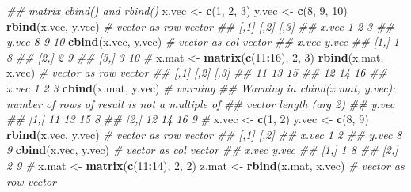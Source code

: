 \documentclass[
]{book}
\newenvironment{Shaded}{\begin{snugshade}}{\end{snugshade}}
\newcommand{\CommentTok}[1]{\textcolor[rgb]{0.56,0.35,0.01}{\textit{#1}}}
\newcommand{\DecValTok}[1]{\textcolor[rgb]{0.00,0.00,0.81}{#1}}
\newcommand{\KeywordTok}[1]{\textcolor[rgb]{0.13,0.29,0.53}{\textbf{#1}}}
\newcommand{\NormalTok}[1]{#1}
\newcommand{\OperatorTok}[1]{\textcolor[rgb]{0.81,0.36,0.00}{\textbf{#1}}}
\newcommand{\StringTok}[1]{\textcolor[rgb]{0.31,0.60,0.02}{#1}}
\begin{document}
\begin{Shaded}
\begin{Highlighting}[]
\CommentTok{\#\# matrix cbind() and rbind()}
\NormalTok{x.vec \textless{}{-}}\StringTok{ }\KeywordTok{c}\NormalTok{(}\DecValTok{1}\NormalTok{, }\DecValTok{2}\NormalTok{, }\DecValTok{3}\NormalTok{)}
\NormalTok{y.vec \textless{}{-}}\StringTok{ }\KeywordTok{c}\NormalTok{(}\DecValTok{8}\NormalTok{, }\DecValTok{9}\NormalTok{, }\DecValTok{10}\NormalTok{)}
\KeywordTok{rbind}\NormalTok{(x.vec, y.vec)  }\CommentTok{\# vector as row vector}
\CommentTok{\#\#       [,1] [,2] [,3]}
\CommentTok{\#\# x.vec    1    2    3}
\CommentTok{\#\# y.vec    8    9   10}
\KeywordTok{cbind}\NormalTok{(x.vec, y.vec)  }\CommentTok{\# vector as col vector}
\CommentTok{\#\#      x.vec y.vec}
\CommentTok{\#\# [1,]     1     8}
\CommentTok{\#\# [2,]     2     9}
\CommentTok{\#\# [3,]     3    10}
\CommentTok{\#}
\NormalTok{x.mat \textless{}{-}}\StringTok{ }\KeywordTok{matrix}\NormalTok{(}\KeywordTok{c}\NormalTok{(}\DecValTok{11}\OperatorTok{:}\DecValTok{16}\NormalTok{), }\DecValTok{2}\NormalTok{, }\DecValTok{3}\NormalTok{)}
\KeywordTok{rbind}\NormalTok{(x.mat, x.vec) }\CommentTok{\# vector as row vector}
\CommentTok{\#\#       [,1] [,2] [,3]}
\CommentTok{\#\#         11   13   15}
\CommentTok{\#\#         12   14   16}
\CommentTok{\#\# x.vec    1    2    3}
\KeywordTok{cbind}\NormalTok{(x.mat, y.vec) }\CommentTok{\# warning}
\CommentTok{\#\# Warning in cbind(x.mat, y.vec): number of rows of result is not a multiple of}
\CommentTok{\#\# vector length (arg 2)}
\CommentTok{\#\#               y.vec}
\CommentTok{\#\# [1,] 11 13 15     8}
\CommentTok{\#\# [2,] 12 14 16     9}
\CommentTok{\#}
\NormalTok{x.vec \textless{}{-}}\StringTok{ }\KeywordTok{c}\NormalTok{(}\DecValTok{1}\NormalTok{, }\DecValTok{2}\NormalTok{)}
\NormalTok{y.vec \textless{}{-}}\StringTok{ }\KeywordTok{c}\NormalTok{(}\DecValTok{8}\NormalTok{, }\DecValTok{9}\NormalTok{)}
\KeywordTok{rbind}\NormalTok{(x.vec, y.vec) }\CommentTok{\# vector as row vector}
\CommentTok{\#\#       [,1] [,2]}
\CommentTok{\#\# x.vec    1    2}
\CommentTok{\#\# y.vec    8    9}
\KeywordTok{cbind}\NormalTok{(x.vec, y.vec) }\CommentTok{\# vector as col vector}
\CommentTok{\#\#      x.vec y.vec}
\CommentTok{\#\# [1,]     1     8}
\CommentTok{\#\# [2,]     2     9}
\CommentTok{\#}
\NormalTok{x.mat \textless{}{-}}\StringTok{ }\KeywordTok{matrix}\NormalTok{(}\KeywordTok{c}\NormalTok{(}\DecValTok{11}\OperatorTok{:}\DecValTok{14}\NormalTok{), }\DecValTok{2}\NormalTok{, }\DecValTok{2}\NormalTok{)}
\NormalTok{z.mat \textless{}{-}}\StringTok{ }\KeywordTok{rbind}\NormalTok{(x.mat, x.vec) }\CommentTok{\# vector as row vector}

\end{Highlighting}
\end{Shaded}
\end{document}
